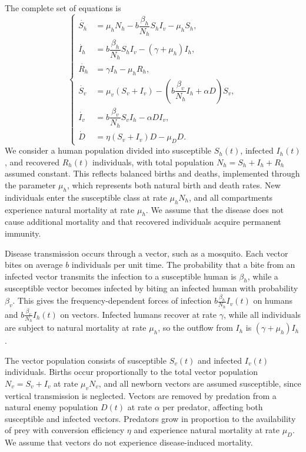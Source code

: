 \documentclass{amsart}
\theoremstyle{definition}
\theoremstyle{remark}
\numberwithin{equation}{section}
\begin{document}
 The complete set of equations is
\begin{equation}\label{modelocompleto}
	\begin{cases}
		\dot{S_h} & = \mu_h N_h - b \dfrac{\beta_{h}}{N_h} S_h I_v - \mu_h S_h,\\
		\dot{I_h} & = b \dfrac{\beta_{h}}{N_h} S_h I_v - (\gamma+\mu_h) I_h, \\
		\dot{R_h} & = \gamma I_h - \mu_h R_h,\\
		\dot{S_v} & = \mu_v (S_v+I_v) - \left( b \dfrac{\beta_{v}}{N_h} I_h + \alpha D \right) S_v, \\
		\dot{I_v} & = b \dfrac{\beta_{v}}{N_h} S_v I_h - \alpha D I_v, \\
		\dot{D} & = \eta (S_v + I_v) D - \mu_D D.
	\end{cases}
\end{equation}
We consider a human population divided into susceptible $S_h(t)$, infected $I_h(t)$, and recovered $R_h(t)$ individuals, with total population $N_h = S_h + I_h + R_h$ assumed constant. This reflects balanced births and deaths, implemented through the parameter $\mu_h$, which represents both natural birth and death rates. New individuals enter the susceptible class at rate $\mu_h N_h$, and all compartments experience natural mortality at rate $\mu_h$. We assume that the disease does not cause additional mortality and that recovered individuals acquire permanent immunity.

Disease transmission occurs through a vector, such as a mosquito. Each vector bites on average $b$ individuals per unit time. The probability that a bite from an infected vector transmits the infection to a susceptible human is $\beta_h$, while a susceptible vector becomes infected by biting an infected human with probability $\beta_v$. This gives the frequency-dependent forces of infection $b \frac{\beta_h}{N_h} I_v(t)$ on humans and $b \frac{\beta_v}{N_h} I_h(t)$ on vectors. Infected humans recover at rate $\gamma$, while all individuals are subject to natural mortality at rate $\mu_h$, so the outflow from $I_h$ is $(\gamma + \mu_h) I_h$.

The vector population consists of susceptible $S_v(t)$ and infected $I_v(t)$ individuals. Births occur proportionally to the total vector population $N_v = S_v + I_v$ at rate $\mu_v N_v$, and all newborn vectors are assumed susceptible, since vertical transmission is neglected. Vectors are removed by predation from a natural enemy population $D(t)$ at rate $\alpha$ per predator, affecting both susceptible and infected vectors. Predators grow in proportion to the availability of prey with conversion efficiency $\eta$ and experience natural mortality at rate $\mu_D$. We assume that vectors do not experience disease-induced mortality.
\end{document}
